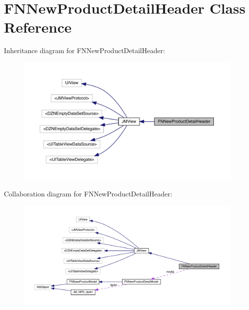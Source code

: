 \hypertarget{interface_f_n_new_product_detail_header}{}\section{F\+N\+New\+Product\+Detail\+Header Class Reference}
\label{interface_f_n_new_product_detail_header}


Inheritance diagram for F\+N\+New\+Product\+Detail\+Header\+:\nopagebreak
\begin{figure}[H]
\begin{center}
\leavevmode
\includegraphics[width=350pt]{interface_f_n_new_product_detail_header__inherit__graph}
\end{center}
\end{figure}


Collaboration diagram for F\+N\+New\+Product\+Detail\+Header\+:\nopagebreak
\begin{figure}[H]
\begin{center}
\leavevmode
\includegraphics[width=350pt]{interface_f_n_new_product_detail_header__coll__graph}
\end{center}
\end{figure}
